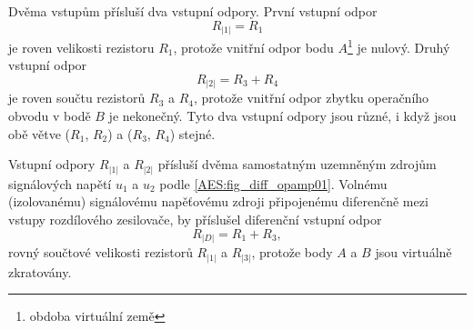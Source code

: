 {        Dvěma vstupům přísluší dva vstupní odpory. První vstupní odpor $$R_{|1|} = R_1$$ je roven 
        velikosti rezistoru $R_1$, protože vnitřní odpor bodu $A$\footnote{obdoba virtuální země} 
        je nulový. Druhý vstupní odpor $$R_{|2|} = R_3 + R_4$$ je roven součtu rezistorů $R_3$ a 
        $R_4$, protože vnitřní odpor zbytku operačního obvodu v bodě $B$ je nekonečný. Tyto dva 
        vstupní odpory jsou různé, i když jsou obě větve ($R_1$, $R_2$) a ($R_3$, $R_4$) stejné. 
        
        Vstupní odpory $R_{|1|}$ a $R_{|2|}$ přísluší dvěma samostatným uzemněným zdrojům 
        signálových napětí $u_1$ a $u_2$ podle \ref{AES:fig_diff_opamp01}. Volnému (izolovanému) 
        signálovému napěťovému zdroji připojenému diferenčně mezi vstupy rozdílového zesilovače, by 
        příslušel diferenční vstupní odpor $$R_{|D|} = R_1 + R_3,$$ rovný součtové velikosti 
        rezistorů $R_{|1|}$ a $R_{|3|}$, protože body $A$ a $B$ jsou virtuálně zkratovány.

} %
\printbibliography[title={Seznam literatury}, heading=subbibliography]
